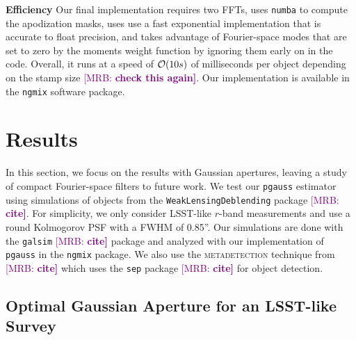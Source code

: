 \documentclass[twocolappendix, appendixfloats, numberedappendix, twocolumn, apj]{openjournal}
\newcommand{\mrb}[1]{\textcolor{purple}{[MRB: \bf #1]}\xspace}
\newcommand{\mdet}{\textsc{metadetection}\xspace}
\newcommand{\pgauss}{\texttt{pgauss}\xspace}
\begin{document}
\textbf{Efficiency} Our final implementation requires two FFTs, uses \texttt{numba} to compute the
apodization masks, uses use a fast exponential implementation that is accurate to float precision,
and takes advantage of Fourier-space modes that are set to zero by the moments weight function by ignoring
them early on in the code. Overall, it runs at a speed of ${\cal O}(10s)$ of milliseconds per
object depending on the stamp size \mrb{check this again}. Our implementation is available in the
\texttt{ngmix} software package.

\section{Results}

In this section, we focus on the results with Gaussian apertures, leaving a study of
compact Fourier-space filters to future work. We test our \pgauss estimator using simulations of objects from the \texttt{WeakLensingDeblending} package \mrb{cite}. For simplicity, we only consider LSST-like $r$-band measurements and use a round
Kolmogorov PSF with a FWHM of 0.85''. Our simulations are done with the \texttt{galsim} \mrb{cite}
package and analyzed with our implementation of \pgauss in the \texttt{ngmix} package. We also
use the \mdet technique from \mrb{cite} which uses the \texttt{sep} package \mrb{cite} for object detection.


\subsection{Optimal Gaussian Aperture for an LSST-like Survey}
\end{document}
